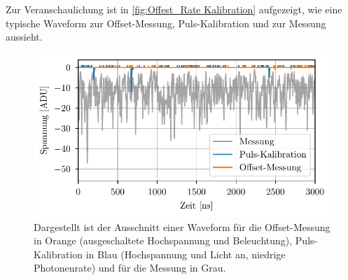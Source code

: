 Zur Veranschaulichung ist in \autoref{fig:Offest_Rate Kalibration} aufgezeigt, wie eine typische Waveform zur Offset-Messung, Puls-Kalibration und zur Messung aussieht. 
\begin{figure}[h]
    \centering
    \includegraphics{images/Datenaufnahme/Kalibration.pdf}
    \caption{Dargestellt ist der Ausschnitt einer Waveform für die Offset-Messung in Orange (ausgeschaltete Hochspannung und Beleuchtung), Puls-Kalibration in Blau (Hochspannung und Licht an, niedrige Photonenrate) und für die Messung in Grau.}
    \label{fig:Offest_Rate Kalibration}
\end{figure}

